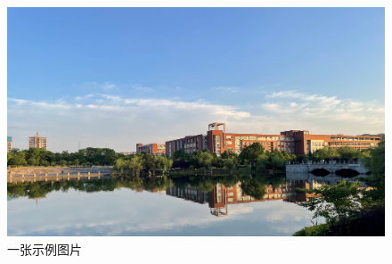 \xiaosi

\lipsum[1-2]



\lipsum[1-2]

\begin{figure}[H]
    \centering
    \includegraphics[width=0.8\linewidth]{img/fig1.jpg}
    \caption{一张示例图片}
    \label{fig:figure3}
\end{figure}